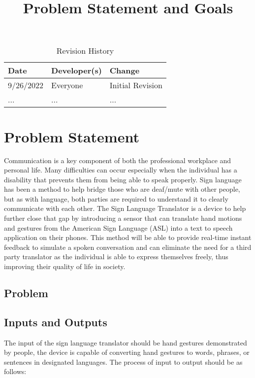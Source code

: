 \documentclass{article}
\title{Problem Statement and Goals\\\progname}
\author{\authname}
\date{}
\begin{document}
\maketitle

\begin{table}[hp]
\caption{Revision History} \label{TblRevisionHistory}
\begin{tabularx}{\textwidth}{llX}
\toprule
\textbf{Date} & \textbf{Developer(s)} & \textbf{Change}\\
\midrule
9/26/2022 & Everyone & Initial Revision\\
... & ... & ...\\
\bottomrule
\end{tabularx}
\end{table}

\section{Problem Statement}

Communication is a key component of both the professional workplace and personal life. Many difficulties
can occur especially when the individual has a disability that prevents them from being able to speak properly.
Sign language has been a method to help bridge those who are deaf/mute with other people, but as with language,
both parties are required to understand it to clearly communicate with each other. The Sign Language Translator
is a device to help further close that gap by introducing a sensor that can translate hand motions and gestures
from the American Sign Language (ASL) into a text to speech application on their phones. This method will be able
to provide real-time instant feedback to simulate a spoken conversation and can eliminate the need for a third party
translator as the individual is able to express themselves freely, thus improving their quality of life in society. 

\subsection{Problem}

\subsection{Inputs and Outputs}

The input of the sign language translator should be hand gestures demonstrated by people, the device is capable of 
converting hand gestures to words, phrases, or sentences in designated languages. The process of input to output 
should be as follows:
\end{document}
